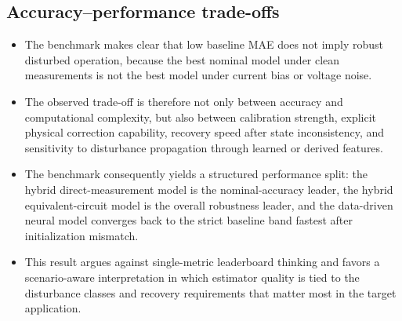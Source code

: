 \documentclass[review]{elsarticle}
\begin{document}
\subsection{Accuracy--performance trade-offs}
\begin{itemize}[leftmargin=*]
    \item The benchmark makes clear that low baseline MAE does not imply robust disturbed operation, because the best nominal model under clean measurements is not the best model under current bias or voltage noise.
    \item The observed trade-off is therefore not only between accuracy and computational complexity, but also between calibration strength, explicit physical correction capability, recovery speed after state inconsistency, and sensitivity to disturbance propagation through learned or derived features.
    \item The benchmark consequently yields a structured performance split: the hybrid direct-measurement model is the nominal-accuracy leader, the hybrid equivalent-circuit model is the overall robustness leader, and the data-driven neural model converges back to the strict baseline band fastest after initialization mismatch.
    \item This result argues against single-metric leaderboard thinking and favors a scenario-aware interpretation in which estimator quality is tied to the disturbance classes and recovery requirements that matter most in the target application.
\end{itemize}
\end{document}
